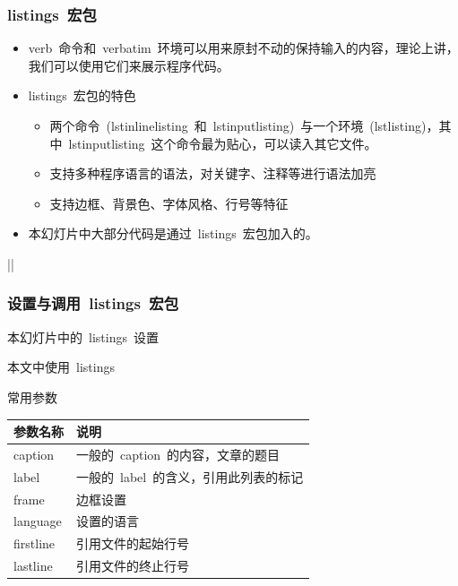 \begin{frame}
	\frametitle{listings~宏包}
	\begin{itemize}
		\item<+-> \alert{verb}~命令和~\alert{verbatim}~环境可以用来原封不动的保持输入的内容，理论上讲，我们可以使用它们来展示程序代码。
		\item<+-> listings~宏包的特色
			\begin{itemize}
				\item<+-> 两个命令~(lst\alert{inline}listing~和~lst\alert{input}listing)~与一个环境~(\alert{lstlisting})，其中~lstinputlisting~这个命令最为贴心，可以读入其它文件。
				\item<+-> 支持多种程序语言的语法，对关键字、注释等进行语法加亮
				\item<+-> 支持边框、背景色、字体风格、行号等特征
			\end{itemize}
		\item<+-> 本幻灯片中大部分代码是通过~listings~宏包加入的。
	\end{itemize}
\end{frame}

\vblst||
\begin{frame}
	\frametitle{设置与调用~listings~宏包}
	\begin{overprint}
		\begin{block}{本幻灯片中的~listings~设置}
			
		\end{block}
		\begin{block}{本文中使用~listings}
			\vblst
		\end{block}
		\begin{block}{常用参数}
			\begin{tabular}[t]{lp{8cm}}
				\hline
				\hline
				参数名称	& 说明\\
				\hline
				caption		& 一般的~caption~的内容，文章的题目\\
				label		& 一般的~label~的含义，引用此列表的标记 \\
				frame		& 边框设置\\
				language	& 设置的语言\\
				firstline	& 引用文件的起始行号\\
				lastline	& 引用文件的终止行号\\
				\hline
				\hline
			\end{tabular}
		\end{block}
	\end{overprint}
	
\end{frame}

